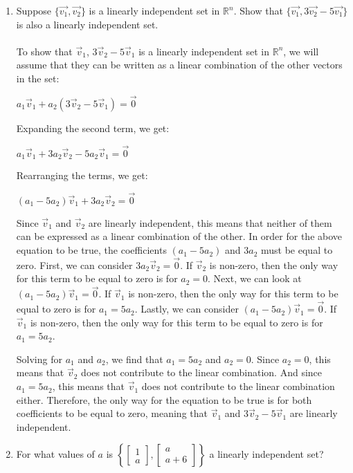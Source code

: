 \begin{enumerate}
\item Suppose $\{\vec{v_1},\vec{v_2}\}$ is a linearly independent set in $\mathbb{R}^n$.  Show that $\{\vec{v_1},3\vec{v_2}-5\vec{v_1}\}$ is also a linearly independent set.\\\\
To show that {$\vec{v}_1$, $3\vec{v}_2 - 5\vec{v}_1$} is a linearly independent set in $\mathbb{R}^n$, we will assume that they can be written as a linear combination of the other vectors in the set:
\begin{center}
$a_1 \vec{v}_1 + a_2 (3\vec{v}_2 - 5\vec{v}_1) = \vec{0}$

Expanding the second term, we get:

$a_1 \vec{v}_1 + 3a_2 \vec{v}_2 - 5a_2 \vec{v}_1 = \vec{0}$

Rearranging the terms, we get:

$(a_1 - 5a_2) \vec{v}_1 + 3a_2 \vec{v}_2 = \vec{0}$
\end{center}
Since $\vec{v}_1$ and $\vec{v}_2$ are linearly independent, this means that neither of them can be expressed as a linear combination of the other. In order for the above equation to be true, the coefficients $(a_1 - 5a_2)$ and $3a_2$ must be equal to zero.
First, we can consider $3a_2\vec{v}_2 = \vec{0}$. If $\vec{v}_2$ is non-zero, then the only way for this term to be equal to zero is for $a_2 = 0$.
Next, we can look at $(a_1 - 5a_2)\vec{v}_1 = \vec{0}$. If $\vec{v}_1$ is non-zero, then the only way for this term to be equal to zero is for $a_1 = 5a_2$.
Lastly, we can consider $(a_1 - 5a_2)\vec{v}_1 = \vec{0}$. If $\vec{v}_1$ is non-zero, then the only way for this term to be equal to zero is for $a_1 = 5a_2$.

Solving for $a_1$ and $a_2$, we find that $a_1 = 5a_2$ and $a_2 = 0$. Since $a_2 = 0$, this means that $\vec{v}_2$ does not contribute to the linear combination. And since $a_1 = 5a_2$, this means that $\vec{v}_1$ does not contribute to the linear combination either. Therefore, the only way for the equation to be true is for both coefficients to be equal to zero, meaning that $\vec{v}_1$ and $3\vec{v}_2 - 5\vec{v}_1$ are linearly independent.


\item For what values of $a$ is $\left\{\left[\begin{array}{c}
1\\
a
\end{array}\right],\left[\begin{array}{c}
a\\
a+6\end{array}\right]\right\}$ a linearly independent set?


\end{enumerate}
